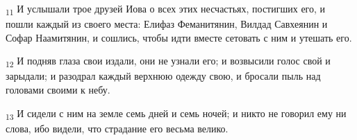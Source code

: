 \begin{tcolorbox}
\textsubscript{11} И услышали трое друзей Иова о всех этих несчастьях, постигших его, и пошли каждый из своего места: Елифаз Феманитянин, Вилдад Савхеянин и Софар Наамитянин, и сошлись, чтобы идти вместе сетовать с ним и утешать его.
\end{tcolorbox}
\begin{tcolorbox}
\textsubscript{12} И подняв глаза свои издали, они не узнали его; и возвысили голос свой и зарыдали; и разодрал каждый верхнюю одежду свою, и бросали пыль над головами своими к небу.
\end{tcolorbox}
\begin{tcolorbox}
\textsubscript{13} И сидели с ним на земле семь дней и семь ночей; и никто не говорил ему ни слова, ибо видели, что страдание его весьма велико.
\end{tcolorbox}

